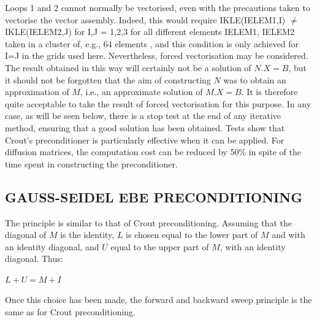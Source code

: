 Loops 1 and 2 cannot normally be vectorised, even with the precautions taken to
vectorise the vector assembly. Indeed, this would require IKLE(IELEM1,I)
$\mathrm{\neq}$ IKLE(IELEM2,J) for I,J = 1,2,3 for all different elements
IELEM1, IELEM2 taken in a cluster of, e.g., 64 elements , and this condition is
only achieved for I=J in the grids used here. Nevertheless, forced
vectorisation may be considered. The result obtained in this way will certainly
not be a solution of $N.X = B$, but it should not be forgotten that the aim of
constructing $N$ was to obtain an approximation of $M$, i.e., an approximate
solution of $M.X = B$. It is therefore quite acceptable to take the result of
forced vectorisation for this purpose. In any case, as will be seen below,
there is a stop test at the end of any iterative method, ensuring that a good
solution has been obtained. Tests show that Crout's preconditioner is
particularly effective when it can be applied. For diffusion matrices, the
computation cost can be reduced by 50\% in spite of the time spent in
constructing the preconditioner.

\subsection{GAUSS-SEIDEL EBE PRECONDITIONING}

The principle is similar to that of Crout preconditioning. Assuming that the
diagonal of $M$ is the identity, $L$ is chosen equal to the lower part of $M$ and
with an identity diagonal, and $U$ equal to the upper part of $M$, with an identity
diagonal. Thus:

$L + U = M + I$

Once this choice has been made, the forward and backward sweep principle is the
same as for Crout preconditioning.

